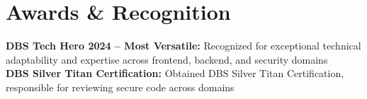 \documentclass[letterpaper,11pt]{article}
\newcommand{\resumeSubHeadingListStart}{\begin{itemize}[leftmargin=0.15in, label={}]}
\newcommand{\resumeSubHeadingListEnd}{\end{itemize}}
\begin{document}

\section{Awards \& Recognition}
  \vspace{2pt}
  \resumeSubHeadingListStart
    \small{\item{
        \textbf{DBS Tech Hero 2024 -- Most Versatile:}{ Recognized for exceptional technical adaptability and expertise across frontend, backend, and security domains} \\ \vspace{2pt}
        \textbf{DBS Silver Titan Certification:}{ Obtained DBS Silver Titan Certification, responsible for reviewing secure code across domains} \\ \vspace{2pt}
    }}
  \resumeSubHeadingListEnd

\end{document}
